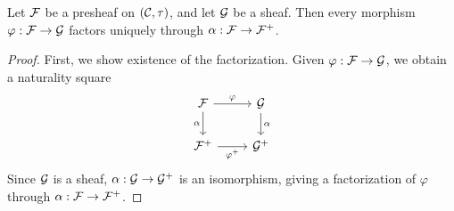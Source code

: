 \begin{proposition}\label{prop:chap:sheaves:sec:sites:factorization through plus construction}
    Let $\cal{F}$ be a presheaf on $(\catC,\tau)$, and let $\cal{G}$ be a sheaf. Then every morphism $\varphi : \cal{F} \to \cal{G}$ factors uniquely through $\alpha : \cal{F} \to \cal{F}^+$.
\end{proposition}
\begin{proof}
    First, we show existence of the factorization. Given $\varphi : \cal{F} \to \cal{G}$, we obtain a naturality square
    \[\begin{tikzcd}[ampersand replacement=\&]
            {\cal{F}} \& {\cal{G}} \\
            {\cal{F}^+} \& {\cal{G}^+}
            \arrow["\varphi", from=1-1, to=1-2]
            \arrow["\alpha"', from=1-1, to=2-1]
            \arrow["\alpha", from=1-2, to=2-2]
            \arrow["{\varphi^+}"', from=2-1, to=2-2]
        \end{tikzcd}\]
    Since $\cal{G}$ is a sheaf, $\alpha : \cal{G} \to \cal{G}^+$ is an isomorphism, giving a factorization of $\varphi$ through $\alpha : \cal{F} \to \cal{F}^+$.


\end{proof}
